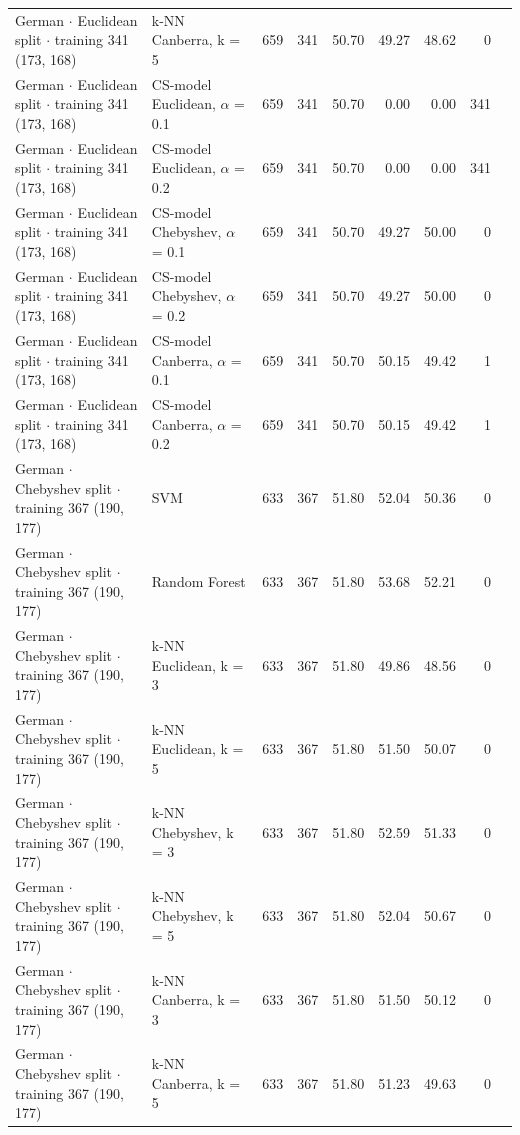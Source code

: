\begin{longtable}{llrrrrrrl}
  German $\cdot$ Euclidean split $\cdot$ training 341 (173, 168) & k-NN Canberra, k = 5 & 659 & 341 & 50.70 & 49.27 & 48.62 & 0 &  \\
  German $\cdot$ Euclidean split $\cdot$ training 341 (173, 168) & CS-model Euclidean, $\alpha$ = 0.1 & 659 & 341 & 50.70 & 0.00 & 0.00 & 341 &  \\
  German $\cdot$ Euclidean split $\cdot$ training 341 (173, 168) & CS-model Euclidean, $\alpha$ = 0.2 & 659 & 341 & 50.70 & 0.00 & 0.00 & 341 &  \\
  German $\cdot$ Euclidean split $\cdot$ training 341 (173, 168) & CS-model Chebyshev, $\alpha$ = 0.1 & 659 & 341 & 50.70 & 49.27 & 50.00 & 0 &  \\
  German $\cdot$ Euclidean split $\cdot$ training 341 (173, 168) & CS-model Chebyshev, $\alpha$ = 0.2 & 659 & 341 & 50.70 & 49.27 & 50.00 & 0 &  \\
  German $\cdot$ Euclidean split $\cdot$ training 341 (173, 168) & CS-model Canberra, $\alpha$ = 0.1 & 659 & 341 & 50.70 & 50.15 & 49.42 & 1 &  \\
  German $\cdot$ Euclidean split $\cdot$ training 341 (173, 168) & CS-model Canberra, $\alpha$ = 0.2 & 659 & 341 & 50.70 & 50.15 & 49.42 & 1 &  \\
  German $\cdot$ Chebyshev split $\cdot$ training 367 (190, 177) & SVM & 633 & 367 & 51.80 & 52.04 & 50.36 & 0 &  \\
  German $\cdot$ Chebyshev split $\cdot$ training 367 (190, 177) & Random Forest & 633 & 367 & 51.80 & 53.68 & 52.21 & 0 &  \\
  German $\cdot$ Chebyshev split $\cdot$ training 367 (190, 177) & k-NN Euclidean, k = 3 & 633 & 367 & 51.80 & 49.86 & 48.56 & 0 &  \\
  German $\cdot$ Chebyshev split $\cdot$ training 367 (190, 177) & k-NN Euclidean, k = 5 & 633 & 367 & 51.80 & 51.50 & 50.07 & 0 &  \\
  German $\cdot$ Chebyshev split $\cdot$ training 367 (190, 177) & k-NN Chebyshev, k = 3 & 633 & 367 & 51.80 & 52.59 & 51.33 & 0 &  \\
  German $\cdot$ Chebyshev split $\cdot$ training 367 (190, 177) & k-NN Chebyshev, k = 5 & 633 & 367 & 51.80 & 52.04 & 50.67 & 0 &  \\
  German $\cdot$ Chebyshev split $\cdot$ training 367 (190, 177) & k-NN Canberra, k = 3 & 633 & 367 & 51.80 & 51.50 & 50.12 & 0 &  \\
  German $\cdot$ Chebyshev split $\cdot$ training 367 (190, 177) & k-NN Canberra, k = 5 & 633 & 367 & 51.80 & 51.23 & 49.63 & 0 &  \\

\end{longtable}
